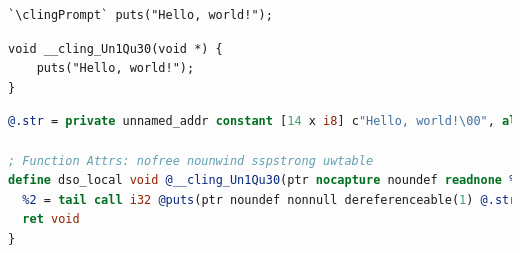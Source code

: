 \begin{lrbox}{\lstlistingIn}
   \begin{lstlisting}[style=c++,backgroundcolor={}]
`\clingPrompt` puts("Hello, world!");
   \end{lstlisting}
\end{lrbox}
\begin{lrbox}{\lstlistingWrap}
   \begin{lstlisting}[style=c++,backgroundcolor={}]
void __cling_Un1Qu30(void *) {
    puts("Hello, world!");
}
   \end{lstlisting}
\end{lrbox}
\begin{lrbox}{\lstlistingCodeGen}
  \begin{lstlisting}[language=llvm]
@.str = private unnamed_addr constant [14 x i8] c"Hello, world!\00", align 1

; Function Attrs: nofree nounwind sspstrong uwtable
define dso_local void @__cling_Un1Qu30(ptr nocapture noundef readnone %0) local_unnamed_addr {
  %2 = tail call i32 @puts(ptr noundef nonnull dereferenceable(1) @.str)
  ret void
}
  \end{lstlisting}
\end{lrbox}

